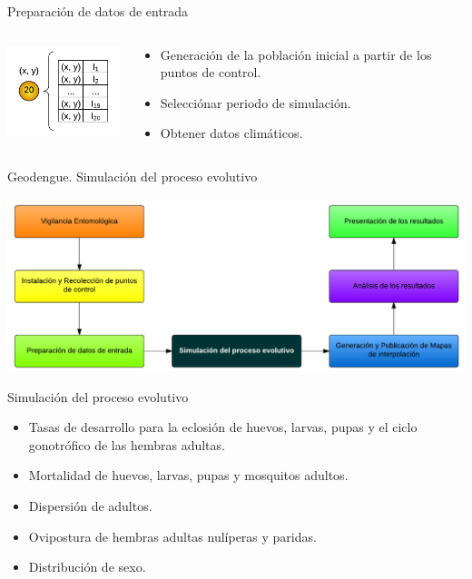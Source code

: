 \begin{frame}[c]{Preparación de datos de entrada}
\begin{columns}[c]
        \begin{column}[c]{4cm}
            \includegraphics[width=4cm]{./graphics/punto-to-array.png}
        \end{column}
        \begin{column}[c]{6cm}
    \begin{itemize}
      \item Generación de la población inicial a partir de los puntos de control.
      \item Selecciónar periodo de simulación.
      \item Obtener datos climáticos.
    \end{itemize}
    \end{column}
\end{columns}
\end{frame}

\begin{frame}[c]{Geodengue. Simulación del proceso evolutivo}
\begin{center}
    \includegraphics[width=\textwidth]{./graphics/propuesta-simulacion.png}
\end{center}
\end{frame}

\begin{frame}[c]{Simulación del proceso evolutivo}
  \begin{itemize}
    \item Tasas de desarrollo para la eclosión de huevos, larvas, pupas y el ciclo gonotrófico de las hembras adultas.
    \item Mortalidad de huevos, larvas, pupas y mosquitos adultos.
    \item Dispersión de adultos.
    \item Ovipostura de hembras adultas nulíperas y paridas.
    \item Distribución de sexo.
  \end{itemize}
\end{frame}

